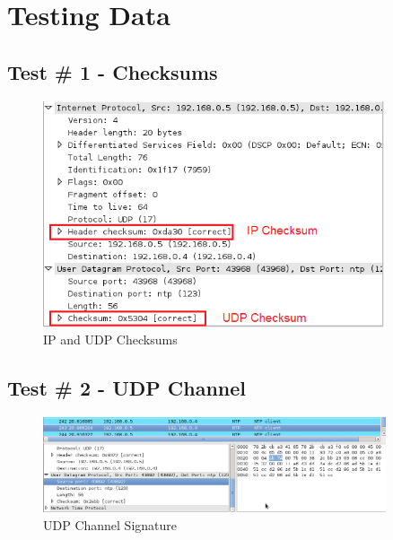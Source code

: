 \documentclass[titlepage]{article}
\begin{document}
\clearpage

\section{Testing Data}

\subsection{Test \# 1 - Checksums}

\begin{figure}[htb]                                                                       
  \begin{center}
    \includegraphics[width=0.9\textwidth]{Pictures/Checksum.png}
  \end{center}
  \caption{IP and UDP Checksums}
  \label{fig:checksums}
\end{figure}

\clearpage

\subsection{Test \# 2 - UDP Channel}

\begin{figure}[htb]                                                                       
  \begin{center}
    \includegraphics[width=0.9\textwidth]{Pictures/UDP_SIG.png}
  \end{center}
  \caption{UDP Channel Signature}
  \label{fig:udp_sig}
\end{figure}
\end{document}
